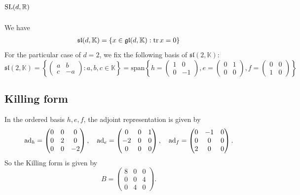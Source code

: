 \documentclass{report}
\begin{document}
\section{$\operatorname{{\mathrm{SL}}}(d,\mathbb R)$}
We have
\begin{align*}
    \mathfrak{sl}(d, \mathbb K) &= \{ x \in \operatorname{{\mathfrak{gl}}}(d, \mathbb K) : \operatorname{tr} x = 0\}\\
\end{align*}
For the particular case of $d = 2$, we fix the following basis of $\mathfrak{sl}(2, \mathbb K)$:
\[
\mathfrak{sl}(2, \mathbb K) = \left\{ \begin{pmatrix} a & b \\ c & -a \end{pmatrix} : a,b,c \in \mathbb K \right\} = \mathrm{span}\left\{ h = \begin{pmatrix} 1 & 0 \\ 0 & -1 \end{pmatrix}, e = \begin{pmatrix} 0 & 1 \\ 0 & 0 \end{pmatrix}, f = \begin{pmatrix} 0 & 0 \\ 1 & 0 \end{pmatrix} \right\}
\]
\subsection{Killing form}
In the ordered basis $h,e,f$, the adjoint representation is given by
\[
\operatorname{ad}_h = \begin{pmatrix} 0 & 0 & 0 \\ 0 & 2 & 0 \\ 0 & 0 & -2 \end{pmatrix}, \quad
\operatorname{ad}_e = \begin{pmatrix} 0 & 0 & 1 \\ -2 & 0 & 0 \\ 0 & 0 & 0 \end{pmatrix}, \quad
\operatorname{ad}_f = \begin{pmatrix} 0 & -1 & 0 \\ 0 & 0 & 0 \\ 2 & 0 & 0 \end{pmatrix}.
\]
So the Killing form is given by
\[
B = \begin{pmatrix} 8 & 0 & 0 \\ 0 & 0 & 4 \\ 0 & 4 & 0 \end{pmatrix}.
\]
\end{document}
